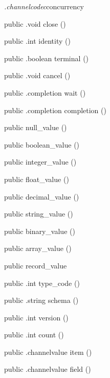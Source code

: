 \begin{CrexxClass}{\textit{.channelcodec}}{concurrency}
\begin{Members}
    \Method
      {public}
      {.void}
      {close}
      {()}

    \Method
      {public}
      {.int}
      {identity}
      {()}

    \Method
      {public}
      {.boolean}
      {terminal}
      {()}

    \Method
      {public}
      {.void}
      {cancel}
      {()}

    \Method
      {public}
      {.completion}
      {wait}
      {()}

    \Method
      {public}
      {.completion}
      {completion}
      {()}

    \Factory
      {public}
      {null\_value}
      {()}

    \Factory
      {public}
      {boolean\_value}
      {()}

    \Factory
      {public}
      {integer\_value}
      {()}

    \Factory
      {public}
      {float\_value}
      {()}

    \Factory
      {public}
      {decimal\_value}
      {()}

    \Factory
      {public}
      {string\_value}
      {()}

    \Factory
      {public}
      {binary\_value}
      {()}

    \Factory
      {public}
      {array\_value}
      {()}

    \Factory
      {public}
      {record\_value}
      {}

    \Method
      {public}
      {.int}
      {type\_code}
      {()}

    \Method
      {public}
      {.string}
      {schema}
      {()}

    \Method
      {public}
      {.int}
      {version}
      {()}

    \Method
      {public}
      {.int}
      {count}
      {()}

    \Method
      {public}
      {.channelvalue}
      {item}
      {()}

    \Method
      {public}
      {.channelvalue}
      {field}
      {()}


\end{Members}
\end{CrexxClass}
